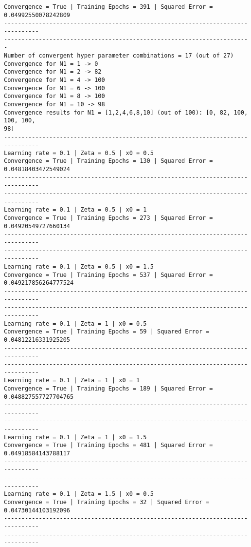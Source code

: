 \documentclass[11pt]{article}
\begin{document}
\begin{Verbatim}[commandchars=\\\{\}]
Convergence = True | Training Epochs = 391 | Squared Error = 0.04992550078242809
--------------------------------------------------------------------------------
-----------------------------------------------------------------------
Number of convergent hyper parameter combinations = 17 (out of 27)
Convergence for N1 = 1 -> 0
Convergence for N1 = 2 -> 82
Convergence for N1 = 4 -> 100
Convergence for N1 = 6 -> 100
Convergence for N1 = 8 -> 100
Convergence for N1 = 10 -> 98
Convergence results for N1 = [1,2,4,6,8,10] (out of 100): [0, 82, 100, 100, 100,
98]
--------------------------------------------------------------------------------
Learning rate = 0.1 | Zeta = 0.5 | x0 = 0.5
Convergence = True | Training Epochs = 130 | Squared Error = 0.04818403472549024
--------------------------------------------------------------------------------
--------------------------------------------------------------------------------
Learning rate = 0.1 | Zeta = 0.5 | x0 = 1
Convergence = True | Training Epochs = 273 | Squared Error = 0.04920549727660134
--------------------------------------------------------------------------------
--------------------------------------------------------------------------------
Learning rate = 0.1 | Zeta = 0.5 | x0 = 1.5
Convergence = True | Training Epochs = 537 | Squared Error =
0.049217856264777524
--------------------------------------------------------------------------------
--------------------------------------------------------------------------------
Learning rate = 0.1 | Zeta = 1 | x0 = 0.5
Convergence = True | Training Epochs = 59 | Squared Error = 0.04812216331925205
--------------------------------------------------------------------------------
--------------------------------------------------------------------------------
Learning rate = 0.1 | Zeta = 1 | x0 = 1
Convergence = True | Training Epochs = 189 | Squared Error =
0.048827557727704765
--------------------------------------------------------------------------------
--------------------------------------------------------------------------------
Learning rate = 0.1 | Zeta = 1 | x0 = 1.5
Convergence = True | Training Epochs = 481 | Squared Error = 0.04918584143788117
--------------------------------------------------------------------------------
--------------------------------------------------------------------------------
Learning rate = 0.1 | Zeta = 1.5 | x0 = 0.5
Convergence = True | Training Epochs = 32 | Squared Error = 0.04730144103192096
--------------------------------------------------------------------------------
--------------------------------------------------------------------------------

\end{Verbatim}
\end{document}
